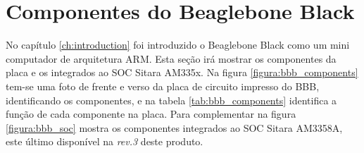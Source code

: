 \section{Componentes do Beaglebone Black}
\label{ch:bbb_components}

No capítulo \ref{ch:introduction} foi introduzido o Beaglebone Black como um mini computador de arquitetura ARM. Esta seção irá mostrar os componentes da placa e os integrados ao SOC Sitara AM335x. Na figura \ref{figura:bbb_components} tem-se uma foto de frente e verso da placa de circuito impresso do BBB, identificando os componentes, e na tabela \ref{tab:bbb_components} identifica a função de cada componente na placa. Para complementar na figura \ref{figura:bbb_soc} mostra os componentes integrados ao SOC Sitara AM3358A, este último disponível na \emph{rev.3} deste produto.

